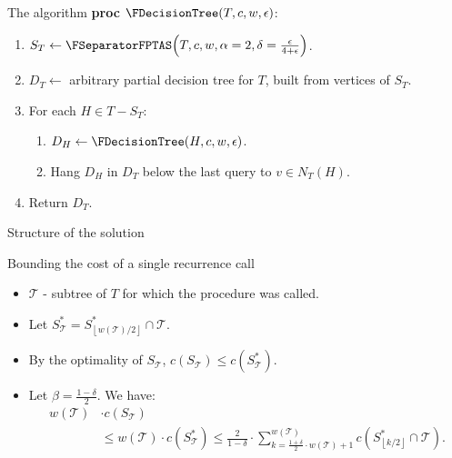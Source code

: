 \documentclass{beamer}
\newcommand{\br}[1]{\mathopen{}\left( #1 \right)}
\newcommand{\fl}[1]{\mathopen{}\left\lfloor #1 \right\rfloor}
\begin{document}
\begin{frame}{The algorithm}
\textbf{proc} $\FDecisionTree\br{T,c,w,\epsilon}$:
\begin{enumerate}
    \item $S_T\gets\FSeparatorFPTAS\br{T, c, w, \alpha=2, \delta = \frac{\epsilon}{4+\epsilon}}$.
    \item $D_T\gets$ arbitrary partial decision tree for $T$, built from vertices of $S_T$.
    \item For each $H\in T-S_T$:
    \begin{enumerate}
        \item $D_H\gets\FDecisionTree\br{H,c,w,\epsilon}$.
        \item Hang $D_H$ in $D_T$ below the last query to $v\in N_T\br{H}$.
    \end{enumerate}
    \item Return $D_T$.
\end{enumerate}
\end{frame}

\begin{frame}{Structure of the solution}

\end{frame}

\begin{frame}{Bounding the cost of a single recurrence call}
\begin{itemize}
    \item $\mathcal{T}$ - subtree of $T$ for which the procedure was called.
    \pause
    \item Let $S_{\mathcal{T}}^*=S_{\fl{w\br{\mathcal{T}}/2}}^*\cap\mathcal{T}$. 
    \pause
    \item By the optimality of $S_{\mathcal{T}}$, $c\br{S_{\mathcal{T}}}\leq c\br{S_{\mathcal{T}}^*}$.
    \pause
    \item Let $\beta=\frac{1-\delta}{2}$. We have:
    \pause
            \begin{align*}
                w\br{\mathcal{T}}&\cdot c\br{S_{\mathcal{T}}}
                \\&\leq 
                w\br{\mathcal{T}}\cdot c\br{S_{\mathcal{T}}^*}\leq \frac{2}{1-\delta}\cdot \sum_{k=\frac{1+\delta}{2}\cdot w\br{\mathcal{T}}+1}^{w\br{\mathcal{T}}}c\br{S_{\fl{k/2}}^*\cap \mathcal{T}}.
            \end{align*}
\end{itemize}
\end{frame}
\end{document}
